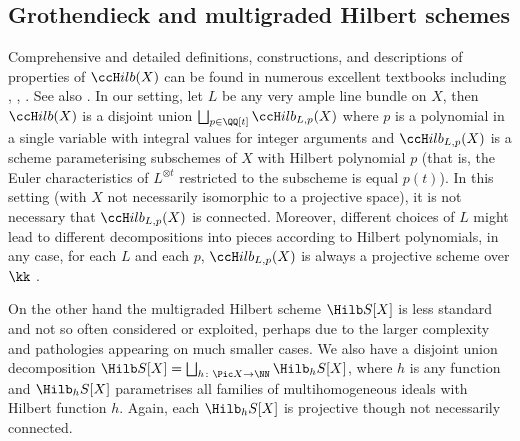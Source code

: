 \documentclass[12pt,a4paper]{article}
\newcommand{\usualHilb}{{\ccH}ilb}
\begin{document}
\subsection{Grothendieck and multigraded Hilbert schemes}
\label{sec_Hilb_schemes}

Comprehensive and detailed definitions, constructions, and descriptions of properties of $\usualHilb(X)$ can be found in numerous excellent textbooks including
\cite[Chapt.~5]{fantechi_et_al_fundamental_ag},
\cite[Chapt.~4]{jelisiejew_PhD},
\cite[Chapt.~4]{sernesi_Deformations_of_algebraic_schemes}.
See also \cite[Chapt.~I]{kollar_book_rational_curves}.
In our setting, let $L$ be any very ample line bundle on $X$, then $\usualHilb(X)$ is a disjoint union $\bigsqcup_{p\in \QQ[t]} \usualHilb_{L,p}(X)$ where $p$ is a polynomial in a single variable with integral values for integer arguments
and $\usualHilb_{L,p}(X)$ is a scheme parameterising subschemes of $X$
with Hilbert polynomial $p$ (that is, the Euler characteristics of $L^{\otimes t}$ restricted to the subscheme is equal $p(t)$).
In this setting (with $X$ not necessarily isomorphic to a projective space), it is not necessary that $\usualHilb_{L,p}(X)$ is connected.
Moreover, different choices of $L$ might lead to different decompositions into pieces according to Hilbert polynomials, in any case, for each $L$ and each $p$, $\usualHilb_{L,p}(X)$ is always a projective scheme over $\kk$ \cite[Thm~I.1.4]{kollar_book_rational_curves}.

On the other hand the multigraded Hilbert scheme $\Hilb S[X]$
is less standard and not so often considered or exploited, perhaps due to the larger complexity and pathologies appearing on much smaller cases.
We also have a disjoint union decomposition
$\Hilb S[X] = \bigsqcup_{h \colon \Pic X \to \NN} \Hilb_h S[X]$, where $h$ is any function and $\Hilb_h S[X]$ parametrises all families of multihomogeneous ideals with Hilbert function $h$. Again, each $\Hilb_h S[X]$ is projective though not necessarily connected.
\end{document}
